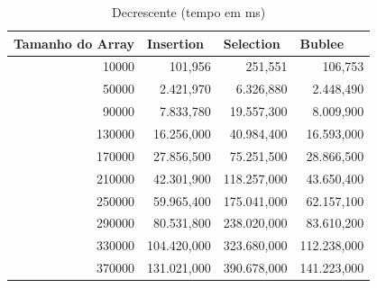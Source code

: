 \documentclass[a4paper, 12pt]{article}
\begin{document}
\begin{longtable}[c]{rrrr}
	\caption{Decrescente (tempo em ms)}
	\label{tab:decrescente1-table}\\
	\hline
	\multicolumn{1}{l}{\textbf{Tamanho do Array}} & \multicolumn{1}{l}{\textbf{Insertion}} & \multicolumn{1}{l}{\textbf{Selection}} & \multicolumn{1}{l}{\textbf{Bublee}} \\ \hline
	\endfirsthead
	\endhead
	\multicolumn{1}{|r|}{10000}                   & \multicolumn{1}{r|}{101,956}           & \multicolumn{1}{r|}{251,551}           & \multicolumn{1}{r|}{106,753}        \\ \hline
	\multicolumn{1}{|r|}{50000}                   & \multicolumn{1}{r|}{2.421,970}         & \multicolumn{1}{r|}{6.326,880}         & \multicolumn{1}{r|}{2.448,490}      \\ \hline
	\multicolumn{1}{|r|}{90000}                   & \multicolumn{1}{r|}{7.833,780}         & \multicolumn{1}{r|}{19.557,300}        & \multicolumn{1}{r|}{8.009,900}      \\ \hline
	\multicolumn{1}{|r|}{130000}                  & \multicolumn{1}{r|}{16.256,000}        & \multicolumn{1}{r|}{40.984,400}        & \multicolumn{1}{r|}{16.593,000}     \\ \hline
	\multicolumn{1}{|r|}{170000}                  & \multicolumn{1}{r|}{27.856,500}        & \multicolumn{1}{r|}{75.251,500}        & \multicolumn{1}{r|}{28.866,500}     \\ \hline
	\multicolumn{1}{|r|}{210000}                  & \multicolumn{1}{r|}{42.301,900}        & \multicolumn{1}{r|}{118.257,000}       & \multicolumn{1}{r|}{43.650,400}     \\ \hline
	\multicolumn{1}{|r|}{250000}                  & \multicolumn{1}{r|}{59.965,400}        & \multicolumn{1}{r|}{175.041,000}       & \multicolumn{1}{r|}{62.157,100}     \\ \hline
	\multicolumn{1}{|r|}{290000}                  & \multicolumn{1}{r|}{80.531,800}        & \multicolumn{1}{r|}{238.020,000}       & \multicolumn{1}{r|}{83.610,200}     \\ \hline
	\multicolumn{1}{|r|}{330000}                  & \multicolumn{1}{r|}{104.420,000}       & \multicolumn{1}{r|}{323.680,000}       & \multicolumn{1}{r|}{112.238,000}    \\ \hline
	\multicolumn{1}{|r|}{370000}                  & \multicolumn{1}{r|}{131.021,000}       & \multicolumn{1}{r|}{390.678,000}       & \multicolumn{1}{r|}{141.223,000}    \\ \hline

\end{longtable}
\end{document}
